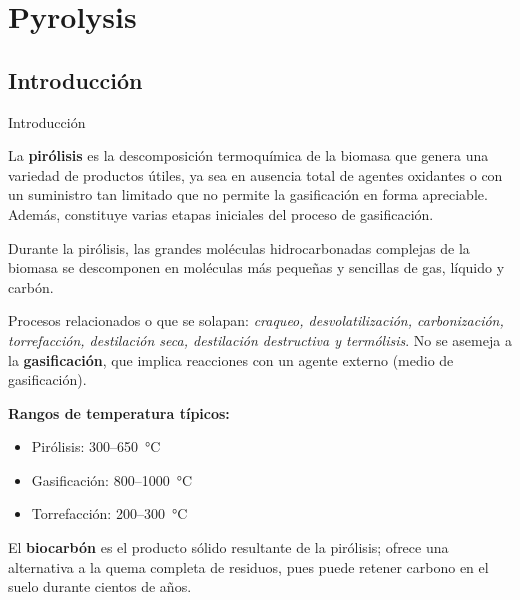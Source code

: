 \documentclass[../../main.tex]{subfiles}
\begin{document}
\section{Pyrolysis}

\subsection{Introducción}
\begin{frame}{Introducción}
\footnotesize
\setlength{\parskip}{2pt}

La \textbf{pirólisis} es la descomposición termoquímica de la biomasa que genera una variedad de productos útiles, ya sea en ausencia total de agentes oxidantes o con un suministro tan limitado que no permite la gasificación en forma apreciable. Además, constituye varias etapas iniciales del proceso de gasificación.

Durante la pirólisis, las grandes moléculas hidrocarbonadas complejas de la biomasa se descomponen en moléculas más pequeñas y sencillas de gas, líquido y carbón.

Procesos relacionados o que se solapan: \emph{craqueo, desvolatilización, carbonización, torrefacción, destilación seca, destilación destructiva y termólisis}. No se asemeja a la \textbf{gasificación}, que implica reacciones con un agente externo (medio de gasificación).

\textbf{Rangos de temperatura típicos:}
\begin{itemize}
\item Pirólisis: 300--650~°C
\item Gasificación: 800--1000~°C
\item Torrefacción: 200--300~°C
\end{itemize}

El \textbf{biocarbón} es el producto sólido resultante de la pirólisis; ofrece una alternativa a la quema completa de residuos, pues puede retener carbono en el suelo durante cientos de años.

\end{frame}
\end{document}
